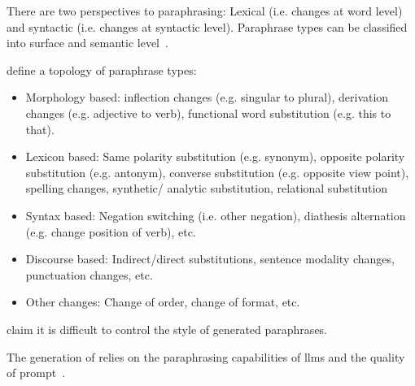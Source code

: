 There are two perspectives to paraphrasing:
Lexical (i.e. changes at word level) and syntactic (i.e. changes at syntactic level).
Paraphrase types can be classified into surface and semantic level~\citep{gohsen_task_oriented_2024}.

\citet{zhou_paraphrase_2025} define a topology of paraphrase types:
\begin{itemize}
    \item Morphology based: inflection changes (e.g. singular to plural), derivation changes (e.g. adjective to verb), functional word substitution (e.g. this to that).
    \item Lexicon based: Same polarity substitution (e.g. synonym), opposite polarity substitution (e.g. antonym), converse substitution (e.g. opposite view point), spelling changes, synthetic/ analytic substitution, relational substitution
    \item Syntax based: Negation switching (i.e. other negation), diathesis alternation (e.g. change position of verb), etc.
    \item Discourse based: Indirect/direct substitutions, sentence modality changes, punctuation changes, etc.
    \item Other changes: Change of order, change of format, etc.
\end{itemize}

\citet{zhou_paraphrase_2021} claim it is difficult to control the style of generated paraphrases.




The generation of \imps{} relies on the paraphrasing capabilities of \acp{llm} and the quality of prompt~\citep{Wu_ODD_challenges_2025}. 


